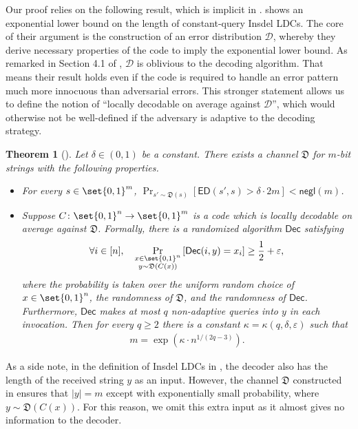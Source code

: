 \documentclass[10pt,a4paper]{article}
\newtheorem{theorem}{Theorem}
\theoremstyle{remark}
\newcommand{\negl}{\ensuremath{\mathsf{negl}}\xspace}
\newcommand{\tuple}[1]{\ensuremath{\left(#1\right)}}
\newcommand{\tp}{\tuple}
\newcommand{\eps}{\ensuremath{\varepsilon}}
\def\+#1{\mathcal{#1}}
\newcommand{\Dec}{\ensuremath{\mathsf{Dec}}\xspace}
\newcommand{\ED}{\ensuremath{\mathsf{ED}}\xspace}%
\begin{document}
Our proof relies on the following result, which is implicit in \cite{blocki2021exponential}. \cite{blocki2021exponential} shows an exponential lower bound on the length of constant-query Insdel LDCs. The core of their argument is the construction of an error distribution $\+D$, whereby they derive necessary properties of the code to imply the exponential lower bound. As remarked in Section 4.1 of \cite{blocki2021exponential}, $\+D$ is oblivious to the decoding algorithm. That means their result holds even if the code is required to handle an error pattern much more innocuous than adversarial errors. This stronger statement allows us to define the notion of ``locally decodable on average against $\+D$'', which would otherwise not be well-defined if the adversary is adaptive to the decoding strategy. 
\begin{theorem}[\cite{blocki2021exponential}]\label{thm:lb-channel}
Let $\delta \in (0,1)$ be a constant. There exists a channel $\mathfrak{D}$ for $m$-bit strings with the following properties.
\begin{itemize}
\item For every $s \in \set{0,1}^m$, $\Pr_{s'\sim \mathfrak{D}(s)}[\ED\tp{s', s} > \delta\cdot 2m] < \negl(m)$.
\item Suppose $C \colon \set{0,1}^n \rightarrow \set{0,1}^m$ is a code which is locally decodable on average against $\mathfrak{D}$. Formally, there is a randomized algorithm $\Dec$ satisfying
\begin{align*}
	\forall i \in [n], \quad \Pr_{\substack{x \in \set{0,1}^n \\ y \sim \mathfrak{D}(C(x))}}\left[ \Dec(i, y) = x_i \right] \ge \frac{1}{2} + \eps,
\end{align*} 
where the probability is taken over the uniform random choice of $x \in \set{0,1}^n$, the randomness of $\mathfrak{D}$, and the randomness of $\Dec$. Furthermore, $\Dec$ makes at most $q$ non-adaptive queries into $y$ in each invocation. Then for every $q\ge 2$ there is a constant $\kappa = \kappa(q,\delta,\eps)$ such that
\begin{align*}
m = \exp\tp{\kappa \cdot n^{1/(2q-3)}}.
\end{align*}
\end{itemize}
\end{theorem}

As a side note, in the definition of Insdel LDCs in \cite{blocki2021exponential}, the decoder also has the length of the received string $y$ as an input. However, the channel $\mathfrak{D}$ constructed in \cite{blocki2021exponential} ensures that $|y|=m$ except with exponentially small probability, where $y \sim \mathfrak{D}(C(x))$. For this reason, we omit this extra input as it almost gives no information to the decoder.
\end{document}
